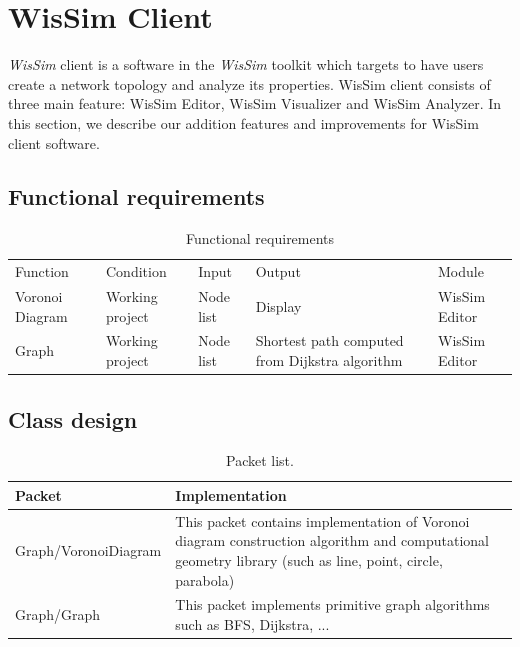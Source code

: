 \section{WisSim Client}
\emph{WisSim} client is a software in the \emph{WisSim} toolkit which targets to have users create a network topology and analyze its properties. WisSim client consists of three main feature: WisSim Editor, WisSim Visualizer and WisSim Analyzer. In this section, we describe our addition features and improvements for WisSim client software. 
\subsection{Functional requirements}
\begin{table}[!htb]
\centering
\caption{Functional requirements}
\label{table-function-require}
\begin{tabular}{|p{2cm}|p{2cm}|p{2cm}|p{3cm}|p{2cm}|}
\cline{1-5}
Function        & Condition       & Input     & Output                                         & Module        \\ \cline{1-5}
Voronoi Diagram & Working project & Node list & Display                                        & WisSim Editor \\ \cline{1-5}
Graph           & Working project & Node list & Shortest path computed from Dijkstra algorithm & WisSim Editor \\ \cline{1-5}
\end{tabular}
\end{table}
\subsection{Class design}

\begin{table}[!htb]
\centering
\caption{Packet list.}
\label{table-class-design}
\begin{tabular}{|l|p{8cm}|}
\hline
Packet               & Implementation                                                                                                                                           \\ \hline
Graph/VoronoiDiagram & This packet contains implementation of Voronoi diagram construction algorithm and computational geometry library (such as line, point, circle, parabola) \\ \hline
Graph/Graph          & This packet implements primitive graph algorithms such as BFS, Dijkstra, ...                                                                             \\ \hline
\end{tabular}
\end{table}

